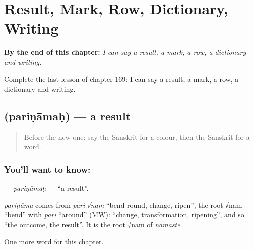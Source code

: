 
\chapter{Result, Mark, Row, Dictionary, Writing}
\label{ch:sa-result-mark-row-dictionary-writing}

\begin{chapteropening}
\textbf{By the end of this chapter:} \emph{I can say a result, a mark, a row, a dictionary and writing.}

Complete the last lesson of chapter 169: I can say a result, a mark, a row, a dictionary and writing.
\end{chapteropening}

\section[\texorpdfstring{\sk{परिणामः} (pariṇāmaḥ)}{परिणामः (pariṇāmaḥ)}]{ (pariṇāmaḥ) — a result}

\label{lesson:SA-C169-parinamah}



\begin{quote}
Before the new one: say the Sanskrit for a colour, then the Sanskrit for a word.
\end{quote}

\subsection*{You'll want to know: }
\textbf{} — \emph{pariṇāmaḥ} — \textquotedblleft{}a result\textquotedblright{}.

\begin{cousinweb}
\emph{pariṇāma} comes from \emph{pari-√nam} \textquotedblleft{}bend round, change, ripen\textquotedblright{}, the root √nam \textquotedblleft{}bend\textquotedblright{} with \emph{pari} \textquotedblleft{}around\textquotedblright{} (MW): \textquotedblleft{}change, transformation, ripening\textquotedblright{}, and so \textquotedblleft{}the outcome, the result\textquotedblright{}. It is the root √nam of \emph{namaste}.
\end{cousinweb}

\begin{grammarlens}[title={What you've built}]
One more word for this chapter.
\end{grammarlens}


